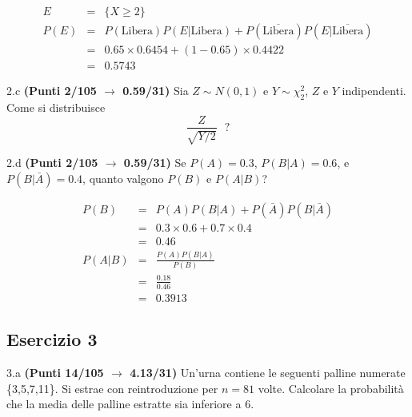 \documentclass[
  11pt,
]{book}
\theoremstyle{mytheoremstyle}
\theoremstyle{mydefstyle}
\newenvironment{sol}
  {
  \begin{tcolorbox}[enhanced,breakable,arc=0.1mm,boxrule=1pt,colback=white,colframe=iblue,
  title=\bf \fontfamily{lmss}\selectfont \hspace{.5 cm} Soluzione,drop fuzzy shadow]

}{
\end{tcolorbox}
  }
\begin{document}
\begin{sol}
\begin{eqnarray*}
E &=& \{X\ge 2\}\\
P(E) &=& P(\text{Libera})P(E|\text{Libera})+P\left(\overline{\text{Libera}}\right)P\left(E|\overline{\text{Libera}}\right)\\
   &=&  0.65\times0.6454+(1-0.65)\times 0.4422\\
  &=& 0.5743
\end{eqnarray*}

\end{sol}

2.c \textbf{(Punti 2/105 \(\rightarrow\) 0.59/31)} Sia \(Z\sim N(0,1)\) e \(Y\sim \chi^2_2\), \(Z\) e \(Y\) indipendenti.
Come si distribuisce
\[
\frac{Z}{\sqrt{Y/2}} ~~~?
\]

2.d \textbf{(Punti 2/105 \(\rightarrow\) 0.59/31)} Se \(P(A)=0.3\), \(P(B|A)=0.6\), e \(P(B|\bar A)=0.4\), quanto valgono \(P(B)\) e \(P(A|B)\)?

\begin{sol}
\begin{eqnarray*}
P(B) &=& P(A)P(B|A)+P(\bar A)P(B|\bar A)\\
     &=& 0.3\times0.6+0.7\times 0.4\\
     &=& 0.46\\
P(A|B) &=& \frac {P(A)P(B|A)}{P(B)}\\
       &=& \frac {0.18}{0.46}\\
       &=& 0.3913
\end{eqnarray*}

\end{sol}

\subsection{Esercizio 3}\label{esercizio-3-30}

3.a \textbf{(Punti 14/105 \(\rightarrow\) 4.13/31)} Un'urna contiene le seguenti palline numerate \{3,5,7,11\}. Si estrae con reintroduzione per \(n=81\) volte.
Calcolare la probabilità che la media delle palline estratte sia inferiore a 6.
\end{document}
